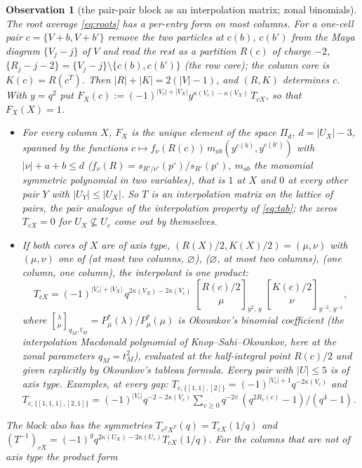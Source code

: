 \documentclass[11pt]{article}
\newtheorem{observation}{Observation}
\newcommand{\cbin}[2]{\genfrac{[}{]}{0pt}{}{#1}{#2}}
\begin{document}
\begin{observation}[the pair-pair block as an interpolation matrix; zonal binomials]\label{obs:zonal}
The root average \eqref{eq:roots} has a per-entry form on most columns.  For a one-cell pair $c=\{V+b,V+b'\}$ remove the
two particles at $c(b)$, $c(b')$ from the Maya diagram $\{V_j-j\}$ of $V$ and read the rest as a partition $R(c)$ of
charge $-2$, $\{R_j-j-2\}=\{V_j-j\}\setminus\{c(b),c(b')\}$ (the \emph{row core}); the \emph{column core} is
$K(c)=R(c^T)$.  Then $|R|+|K|=2(|V|-1)$, and $(R,K)$ determines $c$.  With $y=q^2$ put
$F_X(c):=(-1)^{|V_c|+|V_X|}y^{\kappa(V_c)-\kappa(V_X)}\,T_{cX}$, so that $F_X(X)=1$.
\begin{itemize}
\item[(I)] For every column $X$, $F_X$ is the unique element of the space $\Pi_d$, $d=|U_X|-3$, spanned by the functions
$c\mapsto f_\nu(R(c))\,m_{ab}(y^{c(b)},y^{c(b')})$ with $|\nu|+a+b\le d$ ($f_\nu(R)=s_{R'/\nu'}(p^\circ)/s_{R'}(p^\circ)$,
$m_{ab}$ the monomial symmetric polynomial in two variables), that is $1$ at $X$ and $0$ at every other pair $Y$ with
$|U_Y|\le|U_X|$.  So $T$ is an interpolation matrix on the lattice of pairs, the pair analogue of the interpolation
property of \eqref{eq:tab}; the zeros $T_{cX}=0$ for $U_X\not\subseteq U_c$ come out by themselves.
\item[(II)] If both cores of $X$ are of axis type, $(R(X)/2,K(X)/2)=(\mu,\nu)$ with $(\mu,\nu)$ one of (at most two columns,
$\varnothing$), ($\varnothing$, at most two columns), (one column, one column), the interpolant is one product:
\begin{equation}\label{eq:zonal}
T_{cX}=(-1)^{|V_c|+|V_X|}\,q^{2\kappa(V_X)-2\kappa(V_c)}\;
\cbin{R(c)/2}{\mu}_{y^2,\,y}\;\cbin{K(c)/2}{\nu}_{y^{-2},\,y^{-1}},
\end{equation}
where $\cbin\lambda\mu_{q_M,t_M}=P^*_\mu(\lambda)/P^*_\mu(\mu)$ is Okounkov's binomial coefficient (the interpolation
Macdonald polynomial of Knop--Sahi--Okounkov, here at the zonal parameters $q_M=t_M^2$), evaluated at the half-integral
point $R(c)/2$ and given explicitly by Okounkov's tableau formula.  Every pair with $|U|\le5$ is of axis type.  Examples, at
every gap: $T_{c,\{[1,1],[2]\}}=(-1)^{|V_c|+1}q^{-2\kappa(V_c)}$ and
$T_{c,\{[1,1,1],[2,1]\}}=(-1)^{|V_c|}q^{-2-2\kappa(V_c)}\sum_{v\ge0}q^{-2v}\,(q^{2R_v(c)}-1)/(q^4-1)$.
\end{itemize}
The block also has the symmetries $T_{c^TX^T}(q)=T_{cX}(1/q)$ and
$(T^{-1})_{cX}=(-1)^gq^{2\kappa(U_X)-2\kappa(U_c)}T_{cX}(1/q)$.  For the columns that are not of axis type the product form

\end{observation}
\end{document}
